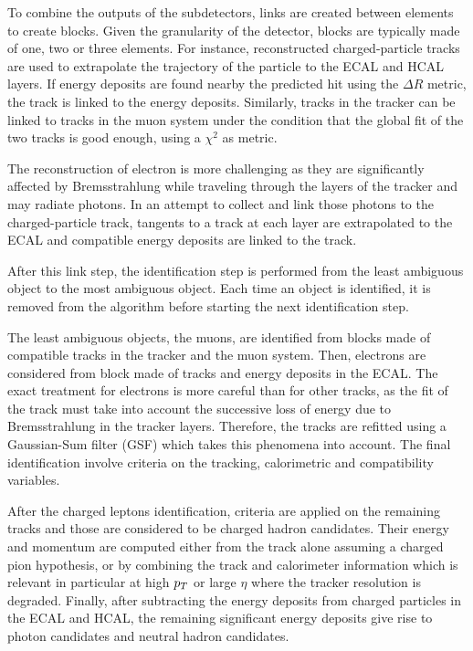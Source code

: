     To combine the outputs of the subdetectors, links are created between elements
    to create blocks. Given the granularity of the detector, blocks are typically made
    of one, two or three elements. For instance, reconstructed charged-particle tracks
    are used to extrapolate the trajectory of the particle to the ECAL and HCAL layers.
    If energy deposits are found nearby the predicted hit using the $\Delta R$
    metric, the track is linked to the energy deposits. Similarly, tracks in the
    tracker can be linked to tracks in the muon system under the condition that the
    global fit of the two tracks is good enough, using a $\chi^2$ as metric.

    The reconstruction of electron is more challenging as they are significantly
    affected by Bremsstrahlung while traveling through the layers of the tracker
    and may radiate photons. In an attempt to collect and link those photons to the
    charged-particle track, tangents to a track at each layer are extrapolated to the
    ECAL and compatible energy deposits are linked to the track.

    After this link step, the identification step is performed from the least ambiguous
    object to the most ambiguous object. Each time an object is identified, it is
    removed from the algorithm before starting the next identification step.

    The least ambiguous objects, the muons, are identified from blocks made of compatible
    tracks in the tracker and the muon system. Then, electrons are considered from
    block made of tracks and energy deposits in the ECAL. The exact treatment for
    electrons is more careful than for other tracks, as the fit of the track must take
    into account the successive loss of energy due to Bremsstrahlung in the tracker
    layers. Therefore, the tracks are refitted using a Gaussian-Sum filter (GSF)
    \cite{GSFelectrons} which takes this phenomena into account. The final identification
    involve criteria on the tracking, calorimetric and compatibility variables.

    After the charged leptons identification, criteria are applied on the remaining
    tracks and those are considered to be charged hadron candidates. Their energy
    and momentum are computed either from the track alone assuming a charged pion
    hypothesis, or by combining the track and calorimeter information which is relevant
    in particular at high $p_T$ or large $\eta$ where the tracker resolution is
    degraded. Finally, after subtracting the energy deposits from charged particles
    in the ECAL and HCAL, the remaining significant energy deposits give rise to photon
    candidates and neutral hadron candidates.

